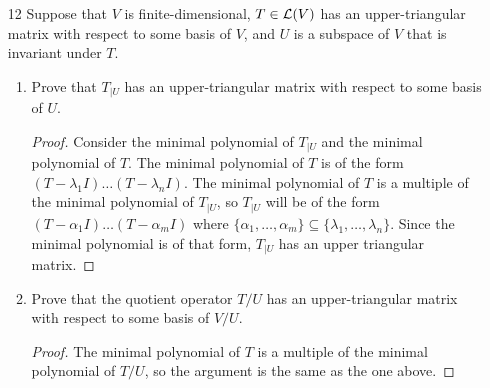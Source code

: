 \begin{enumerate}
\begin{enumerate}
\begin{proof}
        Since $r$ has a smaller degree than $p_v$ and sends $v$ to zero, it must also be zero, so $p = qp_v$ as desired.
    \end{proof}
\end{enumerate}

\item[12] Suppose that $V$ is finite-dimensional, $T \in \mathcal L(V)$ has an upper-triangular matrix with respect to some basis of $V$, and $U$ is a subspace of $V$ that is invariant under $T$. 

\begin{enumerate}
    \item Prove that $T_{|U}$ has an upper-triangular matrix with respect to some basis of $U$.
    
    \begin{proof}
       Consider the minimal polynomial of $T_{|U}$ and the minimal polynomial of $T$. The minimal polynomial of $T$ is of the form $(T - \lambda_1 I) \dots (T - \lambda_n I)$. The minimal polynomial of $T$ is a multiple of the minimal polynomial of $T_{|U}$, so $T_{|U}$ will be of the form $(T - \alpha_1 I) \dots (T - \alpha_m I)$ where $\{\alpha_1, \dots, \alpha_m\} \subseteq \{\lambda_1, \dots, \lambda_n\}$. Since the minimal polynomial is of that form, $T_{|U}$ has an upper triangular matrix. 
    \end{proof}
    \item Prove that the quotient operator $T/U$ has an upper-triangular matrix with respect to some basis of $V/U$.
    \begin{proof}
        The minimal polynomial of $T$ is a multiple of the minimal polynomial of $T/U$, so the argument is the same as the one above.
    \end{proof}
\end{enumerate}
\end{enumerate}